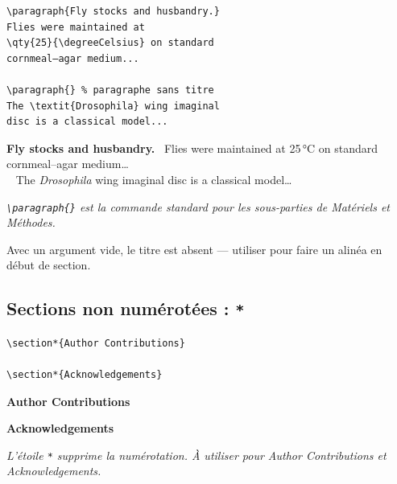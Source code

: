 \documentclass[12pt, a4paper]{article}
\newcommand{\simsectionstar}[1]{%
  \colorbox{ENSbg}{\parbox{\dimexpr\linewidth-2\fboxsep\relax}{%
    \centering\color{ENSorange}\sffamily\bfseries\normalsize
    #1}}\par}
\newcommand{\simparagraph}[1]{%
  {\color{ENSorange}\sffamily\bfseries\small #1}\ }
\begin{document}
\begin{demo}
\begin{lstlisting}[style=latexcode]
\paragraph{Fly stocks and husbandry.}
Flies were maintained at
\qty{25}{\degreeCelsius} on standard
cornmeal–agar medium...

\paragraph{} % paragraphe sans titre
The \textit{Drosophila} wing imaginal
disc is a classical model...
\end{lstlisting}
\tcblower
\simparagraph{Fly stocks and husbandry.}
Flies were maintained at 25\,°C on standard cornmeal–agar medium\ldots\\[8pt]
\simparagraph{}
The \textit{Drosophila} wing imaginal disc is a classical model\ldots\\[6pt]
{\footnotesize\itshape \texttt{\textbackslash paragraph\{\}} est la commande standard pour les sous-parties de Matériels et Méthodes. 

Avec un argument vide, le titre est absent — utiliser pour faire un alinéa en début de section.}
\end{demo}

\newpage

\subsection{Sections non numérotées : \texttt{*}}

\begin{demo}
\begin{lstlisting}[style=latexcode]
\section*{Author Contributions}

\section*{Acknowledgements}
\end{lstlisting}
\tcblower
\simsectionstar{Author Contributions}
\vspace{2pt}
\simsectionstar{Acknowledgements}
\vspace{4pt}
{\footnotesize\itshape L'étoile \texttt{*} supprime la numérotation. À utiliser pour \textit{Author Contributions} et \textit{Acknowledgements}.}
\end{demo}
\end{document}
